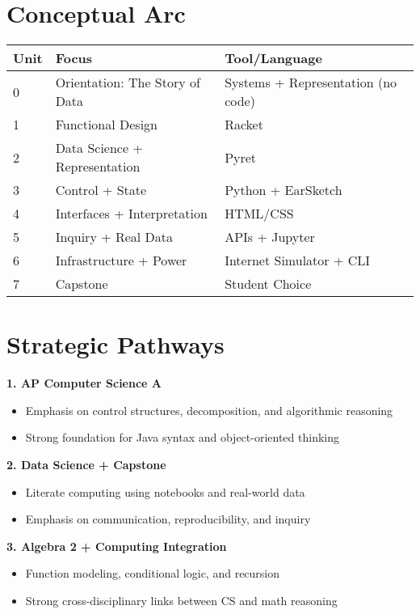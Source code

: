\documentclass[11pt]{article}
\begin{document}
\section*{Conceptual Arc}
\begin{center}
\begin{tabular}{|l|l|l|}
  \hline
  \textbf{Unit} & \textbf{Focus} & \textbf{Tool/Language} \\
  \hline
  0 & Orientation: The Story of Data & Systems + Representation (no code) \\
  1 & Functional Design & Racket \\
  2 & Data Science + Representation & Pyret \\
  3 & Control + State & Python + EarSketch \\
  4 & Interfaces + Interpretation & HTML/CSS \\
  5 & Inquiry + Real Data & APIs + Jupyter \\
  6 & Infrastructure + Power & Internet Simulator + CLI \\
  7 & Capstone & Student Choice \\
  \hline
\end{tabular}
\end{center}

\section*{Strategic Pathways}
\textbf{1. AP Computer Science A}
\begin{itemize}[leftmargin=*]
  \item Emphasis on control structures, decomposition, and algorithmic reasoning
  \item Strong foundation for Java syntax and object-oriented thinking
\end{itemize}

\textbf{2. Data Science + Capstone}
\begin{itemize}[leftmargin=*]
  \item Literate computing using notebooks and real-world data
  \item Emphasis on communication, reproducibility, and inquiry
\end{itemize}

\textbf{3. Algebra 2 + Computing Integration}
\begin{itemize}[leftmargin=*]
  \item Function modeling, conditional logic, and recursion
  \item Strong cross-disciplinary links between CS and math reasoning
\end{itemize}
\end{document}
